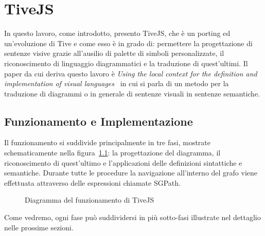 ﻿\chapter{TiveJS}
    In questo lavoro, come introdotto, presento TiveJS, che è un porting ed un'evoluzione di Tive e come esso è in grado di: permettere la progettazione di sentenze visive grazie all'ausilio di palette di simboli personalizzate, il riconoscimento di linguaggio diagrammatici e la traduzione di quest'ultimi.
    \newline
    Il paper da cui deriva questo lavoro è \textit{Using the local context for the definition and implementation of visual languages}~\cite{localcontext} in cui si parla di un metodo per la traduzione di diagrammi o in generale di sentenze visuali in sentenze semantiche.

    \section{Funzionamento e Implementazione}
        Il funzionamento si suddivide principalmente in tre fasi, mostrate schematicamente nella figura~\ref{fig:funzionamento}: la progettazione del diagramma, il riconoscimento di quest'ultimo e l'applicazioni delle definizioni sintattiche e semantiche. Durante tutte le procedure la navigazione all'interno del grafo viene effettuata attraverso delle espressioni chiamate SGPath.
        \newline
        \begin{figure}[htbp]
            \centering
            \caption{Diagramma del funzionamento di TiveJS}
            \label{fig:funzionamento}
        \end{figure}

        Come vedremo, ogni fase può suddividersi in più sotto-fasi illustrate nel dettaglio nelle prossime sezioni.

